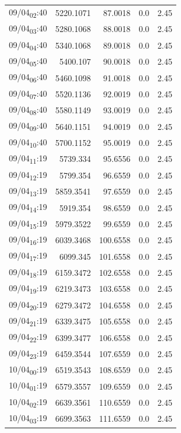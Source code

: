 \documentclass[11pt]{article}
\begin{document}
\begin{center}
\begin{tabular}{lrrrr}
09/04\textsubscript{02}:40 & 5220.1071 & 87.0018 & 0.0 & 2.45\\[0pt]
09/04\textsubscript{03}:40 & 5280.1068 & 88.0018 & 0.0 & 2.45\\[0pt]
09/04\textsubscript{04}:40 & 5340.1068 & 89.0018 & 0.0 & 2.45\\[0pt]
09/04\textsubscript{05}:40 & 5400.107 & 90.0018 & 0.0 & 2.45\\[0pt]
09/04\textsubscript{06}:40 & 5460.1098 & 91.0018 & 0.0 & 2.45\\[0pt]
09/04\textsubscript{07}:40 & 5520.1136 & 92.0019 & 0.0 & 2.45\\[0pt]
09/04\textsubscript{08}:40 & 5580.1149 & 93.0019 & 0.0 & 2.45\\[0pt]
09/04\textsubscript{09}:40 & 5640.1151 & 94.0019 & 0.0 & 2.45\\[0pt]
09/04\textsubscript{10}:40 & 5700.1152 & 95.0019 & 0.0 & 2.45\\[0pt]
09/04\textsubscript{11}:19 & 5739.334 & 95.6556 & 0.0 & 2.45\\[0pt]
09/04\textsubscript{12}:19 & 5799.354 & 96.6559 & 0.0 & 2.45\\[0pt]
09/04\textsubscript{13}:19 & 5859.3541 & 97.6559 & 0.0 & 2.45\\[0pt]
09/04\textsubscript{14}:19 & 5919.354 & 98.6559 & 0.0 & 2.45\\[0pt]
09/04\textsubscript{15}:19 & 5979.3522 & 99.6559 & 0.0 & 2.45\\[0pt]
09/04\textsubscript{16}:19 & 6039.3468 & 100.6558 & 0.0 & 2.45\\[0pt]
09/04\textsubscript{17}:19 & 6099.345 & 101.6558 & 0.0 & 2.45\\[0pt]
09/04\textsubscript{18}:19 & 6159.3472 & 102.6558 & 0.0 & 2.45\\[0pt]
09/04\textsubscript{19}:19 & 6219.3473 & 103.6558 & 0.0 & 2.45\\[0pt]
09/04\textsubscript{20}:19 & 6279.3472 & 104.6558 & 0.0 & 2.45\\[0pt]
09/04\textsubscript{21}:19 & 6339.3475 & 105.6558 & 0.0 & 2.45\\[0pt]
09/04\textsubscript{22}:19 & 6399.3477 & 106.6558 & 0.0 & 2.45\\[0pt]
09/04\textsubscript{23}:19 & 6459.3544 & 107.6559 & 0.0 & 2.45\\[0pt]
10/04\textsubscript{00}:19 & 6519.3543 & 108.6559 & 0.0 & 2.45\\[0pt]
10/04\textsubscript{01}:19 & 6579.3557 & 109.6559 & 0.0 & 2.45\\[0pt]
10/04\textsubscript{02}:19 & 6639.3561 & 110.6559 & 0.0 & 2.45\\[0pt]
10/04\textsubscript{03}:19 & 6699.3563 & 111.6559 & 0.0 & 2.45\\[0pt]
\end{tabular}
\end{center}
\end{document}
